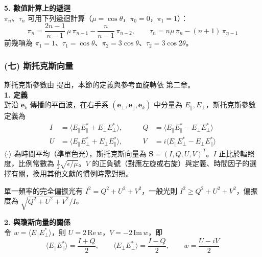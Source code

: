 \textbf{5. 數值計算上的遞迴}\\
$\pi_n$、$\tau_n$ 可用下列遞迴計算（$\mu = \cos\theta$，$\pi_0 = 0$，$\pi_1 = 1$）：
\begin{equation}
    \pi_n = \frac{2n-1}{n-1}\, \mu\, \pi_{n-1} - \frac{n}{n-1}\, \pi_{n-2}, \qquad \tau_n = n \mu\, \pi_n - (n+1)\, \pi_{n-1}
\end{equation}
前幾項為 $\pi_1 = 1$、$\tau_1 = \cos\theta$、$\pi_2 = 3\cos\theta$、$\tau_2 = 3\cos 2\theta$。

\subsubsection*{(七) 斯托克斯向量}
斯托克斯參數由 \textcite{stokes1852Composition} 提出，本節的定義與參考面旋轉依 \textcite{bohren1983Absorption} 第二章。\\

\textbf{1. 定義}\\
對沿 $\mathbf{e}_k$ 傳播的平面波，在右手系 $(\mathbf{e}_{\perp}, \mathbf{e}_{\parallel}, \mathbf{e}_k)$ 中分量為 $E_{\parallel}, E_{\perp}$，斯托克斯參數定義為
\begin{equation}
    \begin{aligned}
        I &= \langle E_{\parallel} E_{\parallel}^* + E_{\perp} E_{\perp}^* \rangle, \qquad & Q &= \langle E_{\parallel} E_{\parallel}^* - E_{\perp} E_{\perp}^* \rangle \\
        U &= \langle E_{\parallel} E_{\perp}^* + E_{\perp} E_{\parallel}^* \rangle, \qquad & V &= i \langle E_{\parallel} E_{\perp}^* - E_{\perp} E_{\parallel}^* \rangle
    \end{aligned} \label{eq:stokes_def}
\end{equation}
$\langle\cdot\rangle$ 為時間平均（準單色光），斯托克斯向量為 $\mathbf{S} = (I, Q, U, V)^{T}$。$I$ 正比於輻照度，比例常數為 $\frac{1}{2}\sqrt{\epsilon/\mu}$。$V$ 的正負號（對應左旋或右旋）與定義、時間因子的選擇有關，換用其他文獻的慣例時需對照。

單一頻率的完全偏振光有 $I^2 = Q^2 + U^2 + V^2$，一般光則 $I^2 \geq Q^2 + U^2 + V^2$，偏振度為 $\sqrt{Q^2+U^2+V^2}/I$。

\textbf{2. 與瓊斯向量的關係}\\
令 $w = \langle E_{\parallel} E_{\perp}^* \rangle$，則 $U = 2\,\mathrm{Re}\, w$，$V = -2\,\mathrm{Im}\, w$，即
\begin{equation}
    \langle E_{\parallel} E_{\parallel}^* \rangle = \frac{I+Q}{2}, \qquad \langle E_{\perp} E_{\perp}^* \rangle = \frac{I-Q}{2}, \qquad w = \frac{U - iV}{2} \label{eq:stokes_inv}
\end{equation}


